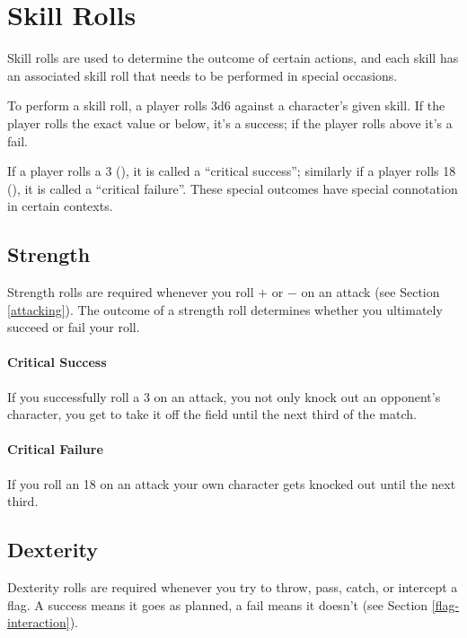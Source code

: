 \section{Skill Rolls}\label{skill-rolls}
Skill rolls are used to determine the outcome of certain actions, and each skill has an associated skill roll that needs to be performed in special occasions.

To perform a skill roll, a player rolls 3d6 against a character's given skill. If the player rolls the exact value or below, it's a success; if the player rolls above it's a fail.

If a player rolls a 3 (), it is called a ``critical success''; similarly if a player rolls 18 (), it is called a ``critical failure''. These special outcomes have special connotation in certain contexts.



\subsection{Strength}
Strength rolls are required whenever you roll $+$ or $-$ on an attack (see Section \ref{attacking}). 
The outcome of a strength roll determines whether you ultimately succeed or fail your roll.

\paragraph{Critical Success} If you successfully roll a 3 on an attack, you not only knock out an opponent's character, you get to take it off the field until the next third of the match.

\paragraph{Critical Failure} If you roll an 18 on an attack your own character gets knocked out until the next third.
\subsection{Dexterity}
Dexterity rolls are required whenever you try to throw, pass, catch, or intercept a flag. A success means it goes as planned, a fail means it doesn't (see Section \ref{flag-interaction}).

